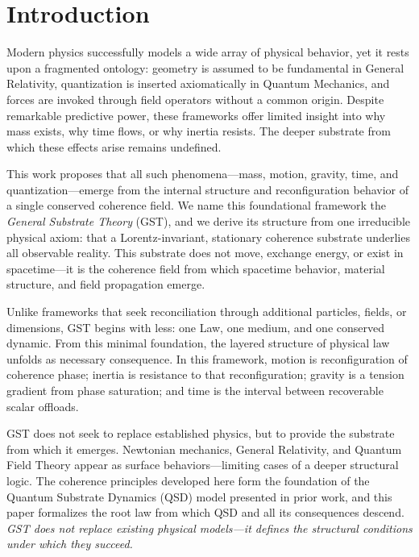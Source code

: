\documentclass[entropy,article,submit,pdftex,moreauthors]{Definitions/mdpi}
\begin{document}

\section{Introduction}
Modern physics successfully models a wide array of physical behavior, yet it rests upon a fragmented ontology: geometry is assumed to be fundamental in General Relativity, quantization is inserted axiomatically in Quantum Mechanics, and forces are invoked through field operators without a common origin. Despite remarkable predictive power, these frameworks offer limited insight into why mass exists, why time flows, or why inertia resists. The deeper substrate from which these effects arise remains undefined.

This work proposes that all such phenomena—mass, motion, gravity, time, and quantization—emerge from the internal structure and reconfiguration behavior of a single conserved coherence field. We name this foundational framework the \textit{General Substrate Theory} (GST), and we derive its structure from one irreducible physical axiom: that a Lorentz-invariant, stationary coherence substrate underlies all observable reality. This substrate does not move, exchange energy, or exist in spacetime—it is the coherence field from which spacetime behavior, material structure, and field propagation emerge.

Unlike frameworks that seek reconciliation through additional particles, fields, or dimensions, GST begins with less: one Law, one medium, and one conserved dynamic. From this minimal foundation, the layered structure of physical law unfolds as necessary consequence. In this framework, motion is reconfiguration of coherence phase; inertia is resistance to that reconfiguration; gravity is a tension gradient from phase saturation; and time is the interval between recoverable scalar offloads.

GST does not seek to replace established physics, but to provide the substrate from which it emerges. Newtonian mechanics, General Relativity, and Quantum Field Theory appear as surface behaviors—limiting cases of a deeper structural logic. The coherence principles developed here form the foundation of the Quantum Substrate Dynamics (QSD) model presented in prior work, and this paper formalizes the root law from which QSD and all its consequences descend. \textit{GST does not replace existing physical models—it defines the structural conditions under which they succeed.}
\end{document}
